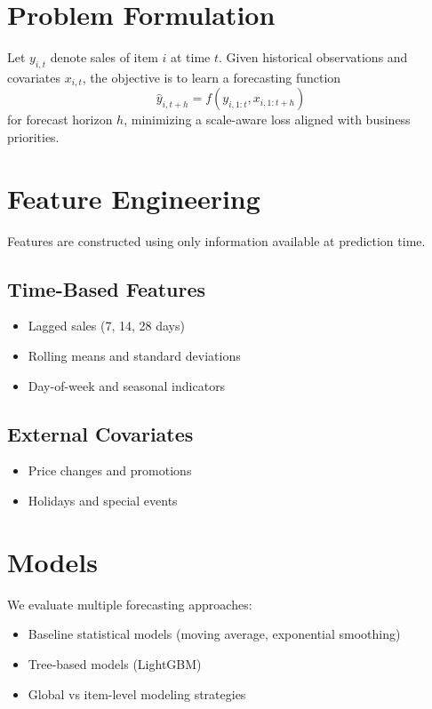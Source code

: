 \documentclass{article}
\begin{document}
\section{Problem Formulation}
Let $y_{i,t}$ denote sales of item $i$ at time $t$.
Given historical observations and covariates $x_{i,t}$, the objective is to learn a forecasting function
\[
\hat{y}_{i,t+h} = f(y_{i,1:t}, x_{i,1:t+h})
\]
for forecast horizon $h$, minimizing a scale-aware loss aligned with business priorities.

\section{Feature Engineering}
Features are constructed using only information available at prediction time.

\subsection{Time-Based Features}
\begin{itemize}[leftmargin=*]
    \item Lagged sales (7, 14, 28 days)
    \item Rolling means and standard deviations
    \item Day-of-week and seasonal indicators
\end{itemize}

\subsection{External Covariates}
\begin{itemize}[leftmargin=*]
    \item Price changes and promotions
    \item Holidays and special events
\end{itemize}

\section{Models}
We evaluate multiple forecasting approaches:

\begin{itemize}[leftmargin=*]
    \item Baseline statistical models (moving average, exponential smoothing)
    \item Tree-based models (LightGBM)
    \item Global vs item-level modeling strategies
\end{itemize}
\end{document}
